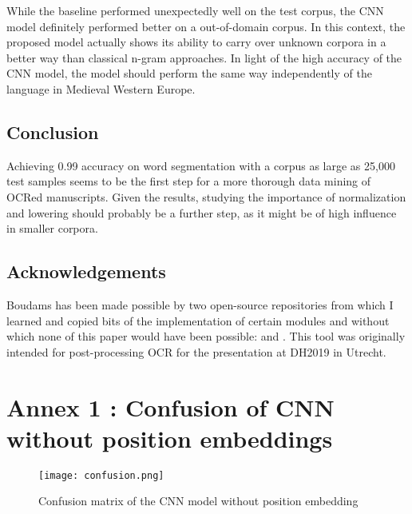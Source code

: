 \documentclass{jdmdh}
\begin{document}
While the baseline performed unexpectedly well on the test corpus, the CNN model definitely performed better on a out-of-domain corpus. In this context, the proposed model actually shows its ability to carry over unknown corpora in a better way than classical n-gram approaches. In light of the high accuracy of the CNN model, the model should perform the same way independently of the language in Medieval Western Europe.

\subsection{Conclusion}

Achieving 0.99 accuracy on word segmentation with a corpus as large as 25,000 test samples seems to be the first step for a more thorough data mining of OCRed manuscripts. Given the results, studying the importance of normalization and lowering should probably be a further step, as it might be of high influence in smaller corpora. 

\subsection{Acknowledgements}

Boudams has been made possible by two open-source repositories from which I learned and copied bits of the implementation of certain modules and without which none of this paper would have been possible: \citet{enrique_manjavacas_2019_2654987} and \citet{bentrevett}. This tool was originally intended for post-processing OCR for the presentation \citet{pinchecampsclerice} at DH2019 in Utrecht.






\appendix\footnotesize

\section{Annex 1 : Confusion of CNN without position embeddings}

\begin{figure}[H]
  \centering
  \texttt{[image: confusion.png]}
  \caption{Confusion matrix of the CNN model without position embedding}
  \label{fig:confusion_matrix}
\end{figure}
\end{document}
